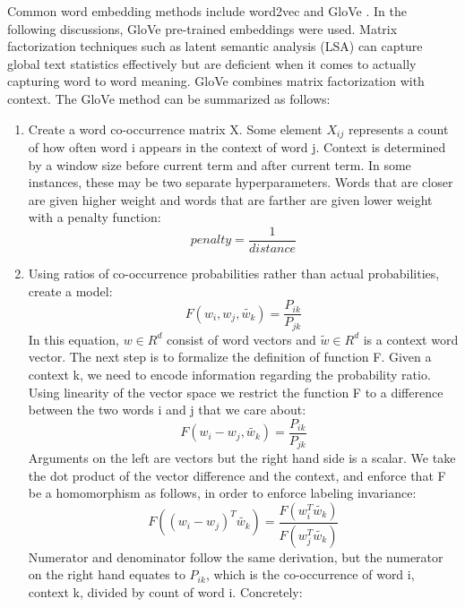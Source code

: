 Common word embedding methods include word2vec and GloVe \cite{pennington_socher_manning}. In the following discussions, GloVe pre-trained embeddings were used. Matrix factorization techniques such as latent semantic analysis (LSA) can capture global text statistics effectively but are deficient when it comes to actually capturing word to word meaning. GloVe combines matrix factorization with context. The GloVe method can be summarized as follows:
\begin{enumerate}
	\item Create a word co-occurrence matrix X. Some element $X_{ij}$ represents a count of how often word i appears in the context of word j. Context is determined by a window size before current term and after current term. In some instances, these may be two separate hyperparameters. Words that are closer are given higher weight and words that are farther are given lower weight with a penalty function:
	\begin{equation}
	penalty = \frac{1}{distance}
	\end{equation}
	\item Using ratios of co-occurrence probabilities rather than actual probabilities, create a model:
	\begin{equation}
	F(w_{i}, w_{j}, \tilde{w_{k}}) = \frac{P_{ik}}{P_{jk}}
	\end{equation}
	In this equation, $w \in R^d$ consist of word vectors and $\tilde{w} \in R^d$ is a context word vector. The next step is to formalize the definition of function F. Given a context k, we need to encode information regarding the probability ratio. Using linearity of the vector space we restrict the function F to a difference between the two words i and j that we care about:
	\begin{equation}
	F(w_{i} - w_{j}, \tilde{w_{k}}) = \frac{P_{ik}}{P_{jk}}
	\end{equation}
	Arguments on the left are vectors but the right hand side is a scalar. We take the dot product of the vector difference and the context, and enforce that F be a homomorphism as follows, in order to enforce labeling invariance:
	\begin{equation}
		F((w_{i} - w_{j})^T\tilde{w_{k}}) = \frac{F(w_{i}^T\tilde{w_{k}})}{F(w_{j}^T\tilde{w_k})}
	\end{equation}
	Numerator and denominator follow the same derivation, but the numerator on the right hand equates to $P_{ik}$, which is the co-occurrence of word i, context k, divided by count of word i. Concretely:
	\begin{equation}

\end{equation}
\end{enumerate}
